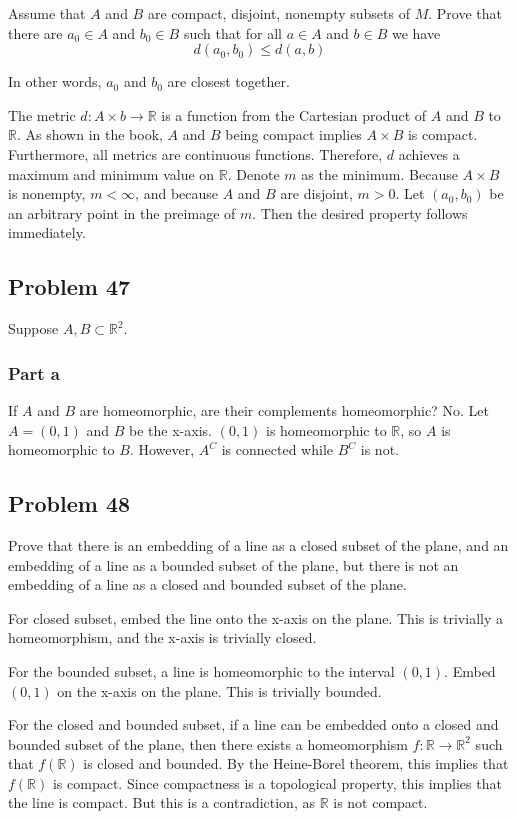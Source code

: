 \documentclass{article}
\begin{document}
Assume that $A$ and $B$ are compact, disjoint, nonempty subsets of $M$. Prove that there are $a_0 \in A$ and $b_0 \in B$ such that for all $a \in A$ and $b \in B$ we have
\[
d(a_0, b_0) \leq d(a, b)
\]

In other words, $a_0$ and $b_0$ are closest together.

The metric $d: A \times b \rightarrow \mathbb{R}$ is a function from the Cartesian product of $A$ and $B$ to $\mathbb{R}$. As shown in the book, $A$ and $B$ being compact implies $A \times B$ is compact. Furthermore, all metrics are continuous functions. Therefore, $d$ achieves a maximum and minimum value on $\mathbb{R}$. Denote $m$ as the minimum. Because $A \times B$ is nonempty, $m < \infty$, and because $A$ and $B$ are disjoint, $m > 0$. Let $(a_0, b_0)$ be an arbitrary point in the preimage of $m$. Then the desired property follows immediately.

\subsection*{Problem 47}
Suppose $A, B \subset \mathbb{R}^2$.

\subsubsection*{Part a}
If $A$ and $B$ are homeomorphic, are their complements homeomorphic?
No. Let $A = (0, 1)$ and $B$ be the x-axis. $(0, 1)$ is homeomorphic to $\mathbb{R}$, so $A$ is homeomorphic to $B$. However, $A^C$ is connected while $B^C$ is not.

\subsection*{Problem 48}

Prove that there is an embedding of a line as a closed subset of the plane, and an embedding of a line as a bounded subset of the plane, but there is not an embedding of a line as a closed and bounded subset of the plane.

For closed subset, embed the line onto the x-axis on the plane. This is trivially a homeomorphism, and the x-axis is trivially closed.

For the bounded subset, a line is homeomorphic to the interval $(0, 1)$. Embed $(0, 1)$ on the x-axis on the plane. This is trivially bounded.

For the closed and bounded subset, if a line can be embedded onto a closed and bounded subset of the plane, then there exists a homeomorphism $f: \mathbb{R} \rightarrow \mathbb{R}^2$ such that $f(\mathbb{R})$ is closed and bounded. By the Heine-Borel theorem, this implies that $f(\mathbb{R})$ is compact. Since compactness is a topological property, this implies that the line is compact. But this is a contradiction, as $\mathbb{R}$ is not compact.
\end{document}
